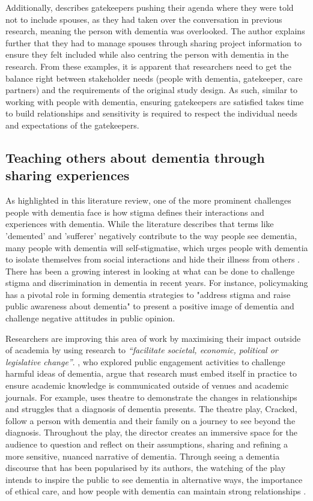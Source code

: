 Additionally, \cite{thoft2021journey} describes gatekeepers pushing their agenda where they were told not to include spouses, as they had taken over the conversation in previous research, meaning the person with dementia was overlooked. The author explains further that they had to manage spouses through sharing project information to ensure they felt included while also centring the person with dementia in the research. From these examples, it is apparent that researchers need to get the balance right between stakeholder needs (people with dementia, gatekeeper, care partners) and the requirements of the original study design. As such, similar to working with people with dementia, ensuring gatekeepers are satisfied takes time to build relationships and sensitivity is required to respect the individual needs and expectations of the gatekeepers.

\subsection{Teaching others about dementia through sharing experiences}
\label{BL:PublicPerception}
As highlighted in this literature review, one of the more prominent challenges people with dementia face is how stigma defines their interactions and experiences with dementia. While the literature describes that terms like 'demented' and 'sufferer' negatively contribute to the way people see dementia, many people with dementia will self-stigmatise, which urges people with dementia to isolate themselves from social interactions and hide their illness from others \citep{milne2010d}. There has been a growing interest in looking at what can be done to challenge stigma and discrimination in dementia in recent years. For instance, policymaking has a pivotal role in forming dementia strategies to "address stigma and raise public awareness about dementia" to present a positive image of dementia and challenge negative attitudes in public opinion. 

Researchers are improving this area of work by maximising their impact outside of academia by using research to \textit{``facilitate societal, economic, political or legislative change''}. \cite{tischler2020using}, who explored public engagement activities to challenge harmful ideas of dementia, argue that research must embed itself in practice to ensure academic knowledge is communicated outside of venues and academic journals. For example, \cite{kontos_raising_2018} uses theatre to demonstrate the changes in relationships and struggles that a diagnosis of dementia presents. The theatre play, Cracked, follow a person with dementia and their family on a journey to see beyond the diagnosis. Throughout the play, the director creates an immersive space for the audience to question and reflect on their assumptions, sharing and refining a more sensitive, nuanced narrative of dementia. Through seeing a dementia discourse that has been popularised by its authors, the watching of the play intends to inspire the public to see dementia in alternative ways, the importance of ethical care, and how people with dementia can maintain strong relationships \citep{gray2020knowledge}.

